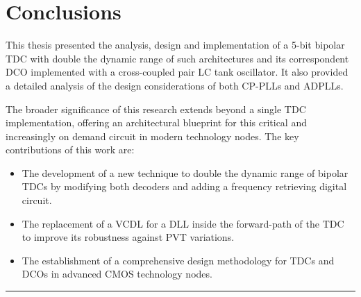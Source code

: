 \chapter{Conclusions}
This thesis presented the analysis, design and implementation of a 5-bit bipolar TDC with double the dynamic range of such architectures and its correspondent DCO implemented with
a cross-coupled pair LC tank oscillator. It also provided a detailed analysis of the design considerations of both CP-PLLs and ADPLLs.

The broader significance of this research extends beyond a single TDC implementation, offering an architectural blueprint for this critical and increasingly on demand circuit in
modern technology nodes.
The key contributions of this work are:
\vspace{0.5cm}

\begin{itemize}
    \item The development of a new technique to double the dynamic range of bipolar TDCs by modifying both decoders and adding a frequency retrieving digital circuit.
    \item The replacement of a VCDL for a DLL inside the forward-path of the TDC to improve its robustness against PVT variations.
    \item The establishment of a comprehensive design methodology for TDCs and DCOs in advanced CMOS technology nodes.
\end{itemize}

\noindent\rule{\textwidth}{1pt}